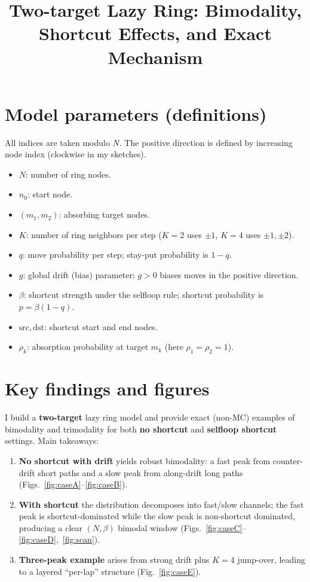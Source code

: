 \documentclass[11pt]{article}
\title{Two-target Lazy Ring: Bimodality, Shortcut Effects, and Exact Mechanism}
\author{}
\date{}
\begin{document}
\sloppy
\maketitle

\section*{Model parameters (definitions)}
All indices are taken modulo $N$. The positive direction is defined by increasing node index (clockwise in my sketches).
\begin{itemize}
  \item $N$: number of ring nodes.
  \item $n_0$: start node.
  \item $(m_1,m_2)$: absorbing target nodes.
  \item $K$: number of ring neighbors per step ($K=2$ uses $\pm1$, $K=4$ uses $\pm1,\pm2$).
  \item $q$: move probability per step; stay-put probability is $1-q$.
  \item $g$: global drift (bias) parameter; $g>0$ biases moves in the positive direction.
  \item $\beta$: shortcut strength under the selfloop rule; shortcut probability is $p=\beta(1-q)$.
  \item $\mathrm{src},\mathrm{dst}$: shortcut start and end nodes.
  \item $\rho_k$: absorption probability at target $m_k$ (here $\rho_1=\rho_2=1$).
\end{itemize}

\section*{Key findings and figures}
I build a \textbf{two-target} lazy ring model and provide exact (non-MC) examples of
bimodality and trimodality for both \textbf{no shortcut} and \textbf{selfloop shortcut} settings.
Main takeaways:
\begin{enumerate}
  \item \textbf{No shortcut with drift} yields robust bimodality: a fast peak from counter-drift short paths and a slow peak from along-drift long paths (Figs.~\ref{fig:caseA}--\ref{fig:caseB}).
  \item \textbf{With shortcut} the distribution decomposes into fast/slow channels; the fast peak is shortcut-dominated while the slow peak is non-shortcut dominated, producing a clear $(N,\beta)$ bimodal window (Figs.~\ref{fig:caseC}--\ref{fig:caseD},~\ref{fig:scan}).
  \item \textbf{Three-peak example} arises from strong drift plus $K=4$ jump-over, leading to a layered ``per-lap'' structure (Fig.~\ref{fig:caseE}).
\end{enumerate}
\end{document}
